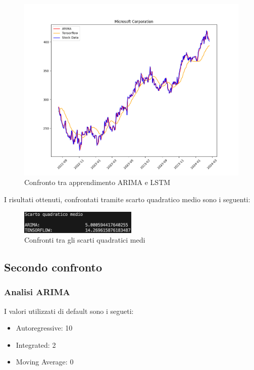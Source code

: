 \documentclass[a4paper,12pt]{article}
\begin{document}
                \begin{figure}[H]
                    \includegraphics[width=\textwidth]{GRAFICO1.png}
                    \caption{Confronto tra apprendimento ARIMA e LSTM}
                \end{figure}
            I risultati ottenuti, confrontati tramite scarto quadratico medio
            sono i seguenti:
            \begin{figure}[H]
                \centering
                \includegraphics[width=0.5\textwidth]{SQM1.png}
                \caption{Confronti tra gli scarti quadratici medi}
            \end{figure}

        \newpage

        \subsection{Secondo confronto}
            \subsubsection{Analisi ARIMA} I valori utilizzati di default sono i
            segueti:
            \begin{itemize}
                \item Autoregressive: 10
                \item Integrated: 2
                \item Moving Average: 0 
            \end{itemize}
\end{document}
